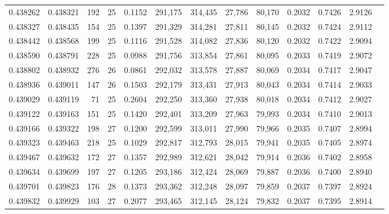 \begin{tabular}{rrrrrrrrrrrrr}
0.438262 & 0.438321 &   192 &  25 &                                     0.1152 & 291,175 & 314,435 &  27,786 &  80,170 & 0.2032 & 0.7426 & 2.9126 \\
0.438327 & 0.438435 &   154 &  25 &                                     0.1397 & 291,329 & 314,281 &  27,811 &  80,145 & 0.2032 & 0.7424 & 2.9112 \\
0.438442 & 0.438568 &   199 &  25 &                                     0.1116 & 291,528 & 314,082 &  27,836 &  80,120 & 0.2032 & 0.7422 & 2.9094 \\
0.438590 & 0.438791 &   228 &  25 &                                     0.0988 & 291,756 & 313,854 &  27,861 &  80,095 & 0.2033 & 0.7419 & 2.9072 \\
0.438802 & 0.438932 &   276 &  26 &                                     0.0861 & 292,032 & 313,578 &  27,887 &  80,069 & 0.2034 & 0.7417 & 2.9047 \\
0.438936 & 0.439011 &   147 &  26 &                                     0.1503 & 292,179 & 313,431 &  27,913 &  80,043 & 0.2034 & 0.7414 & 2.9033 \\
0.439029 & 0.439119 &    71 &  25 &                                     0.2604 & 292,250 & 313,360 &  27,938 &  80,018 & 0.2034 & 0.7412 & 2.9027 \\
0.439122 & 0.439163 &   151 &  25 &                                     0.1420 & 292,401 & 313,209 &  27,963 &  79,993 & 0.2034 & 0.7410 & 2.9013 \\
0.439166 & 0.439322 &   198 &  27 &                                     0.1200 & 292,599 & 313,011 &  27,990 &  79,966 & 0.2035 & 0.7407 & 2.8994 \\
0.439323 & 0.439463 &   218 &  25 &                                     0.1029 & 292,817 & 312,793 &  28,015 &  79,941 & 0.2035 & 0.7405 & 2.8974 \\
0.439467 & 0.439632 &   172 &  27 &                                     0.1357 & 292,989 & 312,621 &  28,042 &  79,914 & 0.2036 & 0.7402 & 2.8958 \\
0.439634 & 0.439699 &   197 &  27 &                                     0.1205 & 293,186 & 312,424 &  28,069 &  79,887 & 0.2036 & 0.7400 & 2.8940 \\
0.439701 & 0.439823 &   176 &  28 &                                     0.1373 & 293,362 & 312,248 &  28,097 &  79,859 & 0.2037 & 0.7397 & 2.8924 \\
0.439832 & 0.439929 &   103 &  27 &                                     0.2077 & 293,465 & 312,145 &  28,124 &  79,832 & 0.2037 & 0.7395 & 2.8914 \\

\end{tabular}

